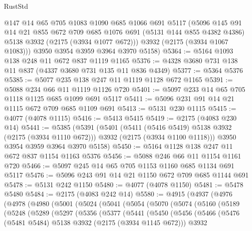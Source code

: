 \begin{lexlean}{RustStd}
\begin{coremodule}
        @147
        @14
        @65
        @705
        @1083
        @1090
        @685
        @1066
        @691
        @5117
        (@5096
          @145
          @91
          @14
          @21
          @855
          @672
          @709
          @685
          @1076
          @691
          (@5131 @144 @855 @4382 @4386)
          @5138
          @3932
          (@2175 (@3934 @1077 @672)))
        @3932
        (@2175 (@3934 @1067 @1083)))
      @3950
      @3954
      @3959
      @3964
      @3970
      @5158)
@5364 := @5164 @1093 @138 @248 @11 @672 @837 @1119 @1165
@5376 := @4328 @3680 @731 @138 @11 @837 (@4337 @3680 @731 @135 @11 @836 @4349)
@5377 := @5364 @5376
@5385 := @5077 @235 @138 @247 @11 @1119 @1128 @672 @1165
@5391 := @5088 @234 @66 @11 @1119 @1126 @720
@5401 := @5097 @233 @14 @65 @705 @1118 @1125 @685 @1099 @691 @5117
@5411 := @5096 @231 @91 @14 @21 @1115 @672 @709 @685 @1109 @691
@5413 := @5131 @230 @1115
@5415 := @4077 (@4078 @1115)
@5416 := @5413 @5415
@5419 := @2175 (@4083 @230 @14)
@5441 := @5385
    (@5391
      (@5401
        (@5411 (@5416 @5419) @5138 @3932 (@2175 (@3934 @1110 @672)))
        @3932
        (@2175 (@3934 @1100 @1118)))
      @3950
      @3954
      @3959
      @3964
      @3970
      @5158)
@5450 := @5164 @1128 @138 @247 @11 @672 @837 @1154 @1163 @5376
@5456 := @5088 @246 @66 @11 @1154 @1161 @720
@5466 := @5097 @245 @14 @65 @705 @1153 @1160 @685 @1134 @691 @5117
@5476 := @5096 @243 @91 @14 @21 @1150 @672 @709 @685 @1144 @691
@5478 := @5131 @242 @1150
@5480 := @4077 (@4078 @1150)
@5481 := @5478 @5480
@5484 := @2175 (@4083 @242 @14)
@5580 := @4915
    (@4937
      (@4976
        (@4978
          (@4980
            (@5001
              (@5024
                (@5041
                  (@5054
                    (@5070
                      (@5074
                        (@5160
                          (@5189
                            (@5248
                              (@5289
                                (@5297
                                  (@5356
                                    (@5377
                                      (@5441
                                        (@5450
                                          (@5456
                                            (@5466
                                              (@5476
                                                (@5481 @5484)
                                                @5138
                                                @3932
                                                (@2175 (@3934 @1145 @672)))
                                              @3932

\end{coremodule}
\end{lexlean}
